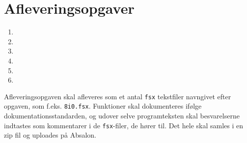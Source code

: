 \documentclass[a4paper,12pt]{article}
\begin{document}
\section*{Afleveringsopgaver}

\begin{enumerate}[label=8i.\arabic*,start=0]
\item 
\item 
\item 
\item 
\item 
\item 
\end{enumerate}


Afleveringsopgaven skal afleveres som et antal \texttt{fsx} tekstfiler navngivet efter opgaven, som f.eks. \lstinline!8i0.fsx!. Funktioner skal dokumenteres ifølge dokumentationsstandarden, og udover selve programteksten skal besvarelserne indtastes som kommentarer i de \texttt{fsx}-filer, de hører til. Det hele skal samles i en zip fil og uploades på Absalon.
\end{document}
